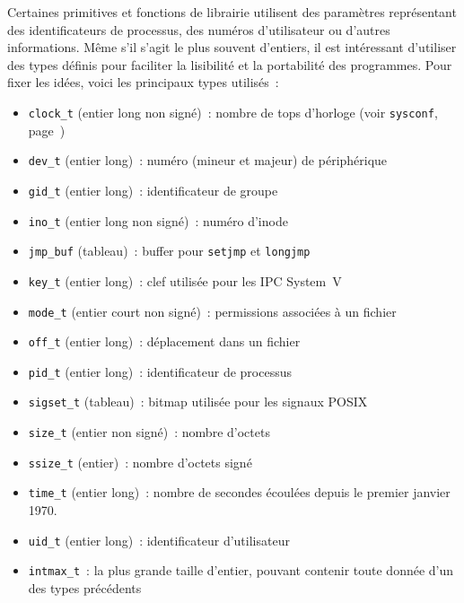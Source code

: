 \documentclass [twoside] {report}
\begin{document}
Certaines primitives et fonctions de librairie utilisent des paramètres
représentant des identificateurs de processus, des numéros d'utilisateur
ou d'autres informations.  Même s'il s'agit le plus souvent d'entiers,
il est intéressant d'utiliser des types définis pour faciliter la
lisibilité et la portabilité des programmes. Pour fixer les idées, voici
les principaux types utilisés~:

\begin {itemize}
    \item \texttt {clock\_t} (entier long non signé)~: nombre de tops
	d'horloge (voir \texttt {sysconf}, page~\pageref {sysconf})
    \item \texttt {dev\_t} (entier long)~: numéro (mineur et majeur) de
	périphérique
    \item \texttt {gid\_t} (entier long)~: identificateur de groupe
    \item \texttt {ino\_t} (entier long non signé)~: numéro d'inode
    \item \texttt {jmp\_buf} (tableau)~: buffer pour \texttt {setjmp} et
	\texttt {longjmp}
    \item \texttt {key\_t} (entier long)~: clef utilisée pour les IPC System~V
    \item \texttt {mode\_t} (entier court non signé)~: permissions associées
	à un fichier
    \item \texttt {off\_t} (entier long)~: déplacement dans un fichier
    \item \texttt {pid\_t} (entier long)~: identificateur de processus
    \item \texttt {sigset\_t} (tableau)~: bitmap utilisée pour les signaux POSIX
    \item \texttt {size\_t} (entier non signé)~: nombre d'octets
    \item \texttt {ssize\_t} (entier)~: nombre d'octets signé
    \item \texttt {time\_t} (entier long)~: nombre de secondes écoulées
	depuis le premier janvier 1970.
    \item \texttt {uid\_t} (entier long)~: identificateur d'utilisateur
    \item \texttt {intmax\_t}~: la plus grande taille d'entier,
	pouvant contenir toute donnée d'un des types précédents

\end {itemize}



\end{document}
